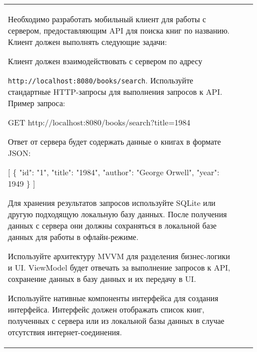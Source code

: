 \documentclass[a4paper]{article}
\begin{document}
\begin{tabular}{!{\vrule width 2pt}p{5cm}|p{6cm}|p{4cm}!{\vrule width 2pt}}
{\begin{minipage}{16cm}
\begin{enumerate}
Необходимо разработать мобильный клиент для работы с сервером, предоставляющим API для поиска книг по названию. Клиент должен выполнять следующие задачи:


Клиент должен взаимодействовать с сервером по адресу 

\texttt{http://localhost:8080/books/search}. Используйте стандартные HTTP-запросы для выполнения запросов к API. Пример запроса:

 GET http://localhost:8080/books/search?title=1984 

Ответ от сервера будет содержать данные о книгах в формате JSON:

 [ \{ "id": "1", "title": "1984", "author": "George Orwell",
     "year": 1949 \} ] 


Для хранения результатов запросов используйте SQLite или другую подходящую локальную базу данных. После получения данных с сервера они должны сохраняться в локальной базе данных для работы в офлайн-режиме.


Используйте архитектуру MVVM для разделения бизнес-логики и UI. ViewModel будет отвечать за выполнение запросов к API, сохранение данных в базу данных и их передачу в UI.


Используйте нативные компоненты интерфейса для создания интерфейса. Интерфейс должен отображать список книг, полученных с сервера или из локальной базы данных в случае отсутствия интернет-соединения.



\end{enumerate}
\end{minipage}}
\end{tabular}
\end{document}
